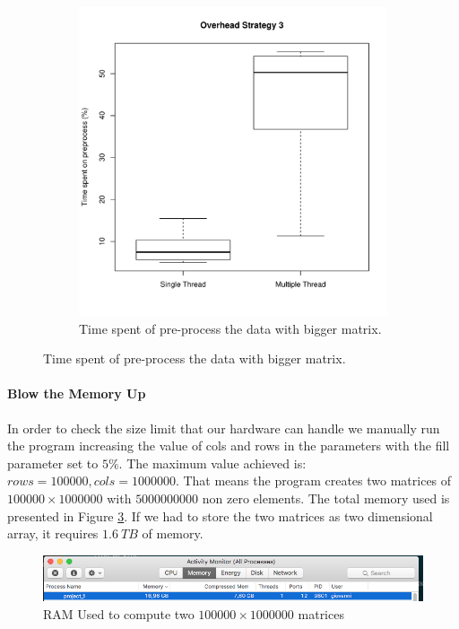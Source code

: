 \documentclass[]{article}
\begin{document}
\begin{figure}[H]
\begin{subfigure}{.6\textwidth}
        \includegraphics[width=1\textwidth]{img/init_phase_strategy_3.pdf}
        \caption
        {Time spent of pre-process the data with bigger matrix.}
        \label{fig:str_3_init}
    \end{subfigure}%
\end{figure}

\newpage
{}
\paragraph{Blow the Memory Up}
In order to check the size limit that our hardware can handle we manually run the program increasing the value of cols and rows in the parameters with the fill parameter set to $5\%$.
The maximum value achieved is: $rows=100000, cols=1000000$. That means the program creates two matrices of $100000\times 1000000$ with $5000000000$ non zero elements. The total memory used is presented in Figure \ref{fig:memory_blowed_up}.
If we had to store the two matrices as two dimensional array, it requires $1.6\ TB$ of memory.

\begin{figure}[H]
	\centering
	\includegraphics[width=1.15\textwidth]{img/memory_used.png}
	\caption
	{RAM Used to compute two $100000\times1000000$ matrices}
	\label{fig:memory_blowed_up}
\end{figure}
\end{document}
